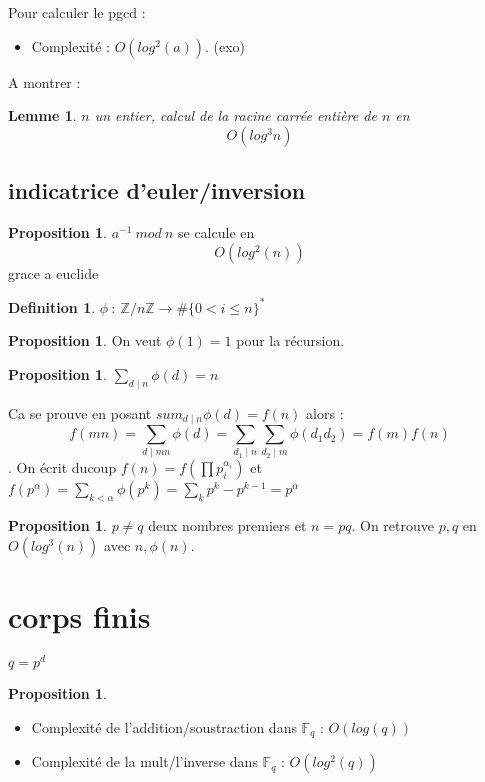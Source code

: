 \documentclass[12pt]{article}
\theoremstyle{plain}
\newtheorem{lem}[subsubsection]{Lemme}
\theoremstyle{definition}
\newtheorem{defn}[subsubsection]{Definition}
\newtheorem{prop}[subsubsection]{Proposition}
\newcommand{\Z}{\mathbb{Z}}
\begin{document}
Pour calculer le pgcd :
\begin{itemize}
    \item Complexité : $O(log^2(a))$. (exo)
\end{itemize}

A montrer :
\begin{lem}
    $n$ un entier, calcul de la racine carrée entière de $n$ en $$O(log^3n)$$
\end{lem}

\subsection{indicatrice d'euler/inversion}
\begin{prop}
    $a^{-1}~mod~n$ se calcule en $$O(log^2(n))$$ grace a euclide
\end{prop}

\begin{defn}
    $\phi~:~\Z/n\Z\rightarrow\#\{0<i\leq n\}^*$
\end{defn}

\begin{prop}
    On veut $\phi(1)=1$ pour la récursion.
\end{prop}

\begin{prop}
    $\sum_{d\mid n}\phi(d)=n$
\end{prop}
Ca se prouve en posant $sum_{d\mid n}\phi(d)=f(n)$ alors : $$f(mn)=\sum_{d\mid mn}\phi(d)=\sum_{d_1\mid n}\sum_{d_2\mid m}\phi(d_1d_2)=f(m)f(n)$$. 
On écrit ducoup $f(n)=f(\prod p_i^{\alpha_i})$ et $f(p^{\alpha})=\sum_{k<\alpha} \phi(p^k)=\sum_{k}p^{k}-p^{k-1}=p^{\alpha}$

\begin{prop}
    $p\ne q$ deux nombres premiers et $n=pq$. On retrouve $p,q$ en $O(log^3(n))$ avec $n,\phi(n)$.
\end{prop}

\newpage
\section{corps finis}
$q=p^d$
\begin{prop}
    \begin{itemize}
        \item Complexité de l'addition/soustraction dans $\mathbb{F}_q$ : $O(log(q))$
        \item Complexité de la mult/l'inverse dans $\mathbb{F}_q$ : $O(log^2(q))$
    \end{itemize}
\end{prop}
\end{document}
